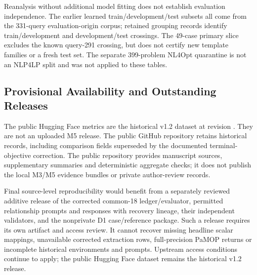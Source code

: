 Reanalysis without additional model fitting does not establish evaluation
independence. The earlier learned train/development/test subsets all come
from the 331-query evaluation-origin corpus; retained grouping records
identify train/development and development/test crossings. The 49-case
primary slice excludes the known query-291 crossing, but does not certify
new template families or a fresh test set. The separate 399-problem NL4Opt
quarantine is not an NLP4LP split and was not applied to these tables.

\subsection{Provisional Availability and Outstanding Releases}
The public Hugging Face metrics are the historical v1.2 dataset at revision . They are not an uploaded M5 release. The public GitHub repository retains historical records, including comparison fields superseded by the documented terminal-objective correction. The public repository provides manuscript sources, supplementary summaries and deterministic aggregate checks; it does not publish the local M3/M5 evidence bundles or private author-review records.

Final source-level reproducibility would benefit from a separately reviewed additive release of the corrected common-18 ledger/evaluator, permitted relationship prompts and responses with recovery lineage, their independent validators, and the nonprivate D1 case/reference package. Such a release requires its own artifact and access review. It cannot recover missing headline scalar mappings, unavailable corrected extraction rows, full-precision PaMOP returns or incomplete historical environments and prompts. Upstream access conditions continue to apply; the public Hugging Face dataset remains the historical v1.2 release.
